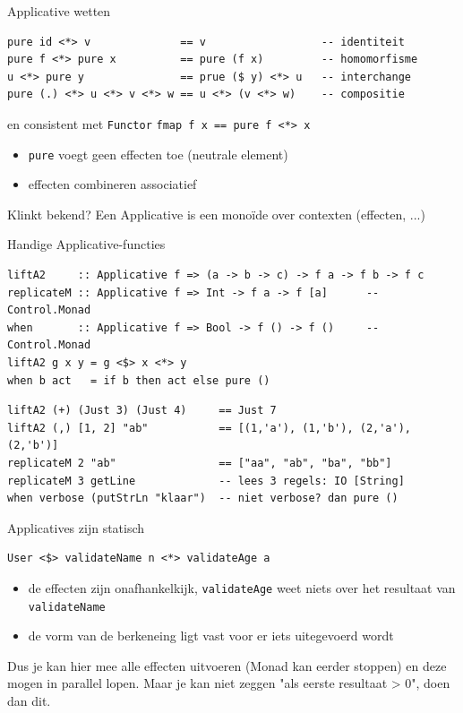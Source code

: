 \documentclass[aspectratio=169,11pt]{beamer}
\newcommand{\hs}{\lstinline[style=hsinline]}
\begin{document}
\begin{frame}[fragile]{Applicative wetten}
\begin{lstlisting}
pure id <*> v              == v                  -- identiteit
pure f <*> pure x          == pure (f x)         -- homomorfisme
u <*> pure y               == prue ($ y) <*> u   -- interchange
pure (.) <*> u <*> v <*> w == u <*> (v <*> w)    -- compositie
\end{lstlisting}
en consistent met \hs|Functor| \hs|fmap f x == pure f <*> x|
\pause 
\begin {itemize}
\item \hs|pure| voegt \alert{geen effecten} toe (neutrale element)
\item effecten combineren \alert{associatief}
\end {itemize}
Klinkt bekend?
\pause 
Een Applicative is een monoïde over contexten (effecten, ...)
\end{frame}

\begin{frame}[fragile]{Handige Applicative-functies}
\begin{lstlisting}[morekeywords={[3]{replicateM,when}}]
liftA2     :: Applicative f => (a -> b -> c) -> f a -> f b -> f c
replicateM :: Applicative f => Int -> f a -> f [a]      -- Control.Monad
when       :: Applicative f => Bool -> f () -> f ()     -- Control.Monad
liftA2 g x y = g <$> x <*> y
when b act   = if b then act else pure ()
\end{lstlisting}
  \pause
\begin{lstlisting}[morekeywords={[3]{replicateM,when}}]
liftA2 (+) (Just 3) (Just 4)     == Just 7
liftA2 (,) [1, 2] "ab"           == [(1,'a'), (1,'b'), (2,'a'), (2,'b')]
replicateM 2 "ab"                == ["aa", "ab", "ba", "bb"]
replicateM 3 getLine             -- lees 3 regels: IO [String]
when verbose (putStrLn "klaar")  -- niet verbose? dan pure ()
\end{lstlisting}
\end{frame}

\begin{frame}[fragile]{Applicatives zijn statisch}
\begin{lstlisting}
User <$> validateName n <*> validateAge a
\end{lstlisting}
\begin{itemize}
\item de effecten zijn \alert{onafhankelkijk}, \hs|validateAge| weet niets over het resultaat van \hs|validateName|
\item de vorm van de berkeneing ligt vast \alert{voor} er iets uitegevoerd wordt
\end{itemize}
\pause 
Dus je kan hier mee alle effecten uitvoeren (Monad kan eerder stoppen) en deze mogen in \alert{parallel} lopen.
\pause 
Maar je kan \alert{niet} zeggen "als eerste resultaat > 0", doen dan dit.
\end{frame}
\end{document}
